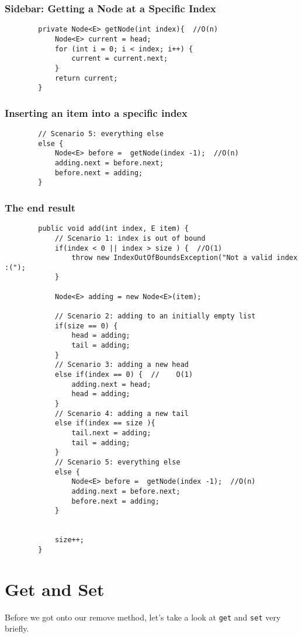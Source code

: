 	
	\subsubsection{Sidebar: Getting a Node at a Specific Index}
	\begin{verbatim}
		private Node<E> getNode(int index){  //O(n)
			Node<E> current = head;
			for (int i = 0; i < index; i++) {
				current = current.next;
			}
			return current;
		}	
	\end{verbatim}
	
	
	
	\subsubsection{Inserting an item into a specific index}
	
	\begin{verbatim}
		// Scenario 5: everything else
		else {
			Node<E> before =  getNode(index -1);  //O(n)
			adding.next = before.next;
			before.next = adding;
		}	
	\end{verbatim}
	
	\subsubsection{The end result}
	\begin{verbatim}
		public void add(int index, E item) {
			// Scenario 1: index is out of bound
			if(index < 0 || index > size ) {  //O(1)
				throw new IndexOutOfBoundsException("Not a valid index :(");
			}
			
			Node<E> adding = new Node<E>(item);
			
			// Scenario 2: adding to an initially empty list
			if(size == 0) {
				head = adding;
				tail = adding;
			}
			// Scenario 3: adding a new head
			else if(index == 0) {  //    O(1)
				adding.next = head;
				head = adding;
			}
			// Scenario 4: adding a new tail
			else if(index == size ){
				tail.next = adding;
				tail = adding;
			}
			// Scenario 5: everything else
			else {
				Node<E> before =  getNode(index -1);  //O(n)
				adding.next = before.next;
				before.next = adding;
			}
			
			
			size++;
		}
	\end{verbatim}
	
	
	
	\section{Get and Set}
	Before we got onto our remove method, let's take a look at \texttt{get} and \texttt{set} very briefly.
	
